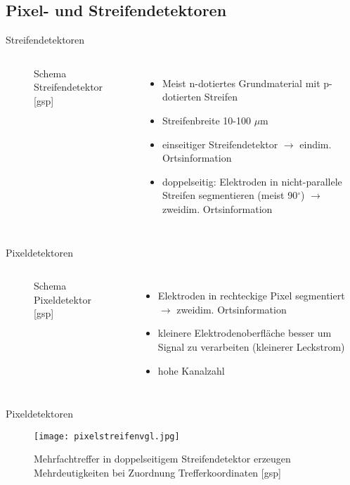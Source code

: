 \subsection[]{Pixel- und Streifendetektoren}


\begin{frame}{Streifendetektoren}
	\begin{columns}[T]
			\begin{figure}[htbp]
			  \centering
			   
			  \caption{Schema Streifendetektor [gsp]}
			\end{figure}
	    	\begin{itemize}
			  \item Meist n-dotiertes Grundmaterial mit p-dotierten Streifen
			  \item Streifenbreite 10-100 $\mu$m
			  \item einseitiger Streifendetektor $\rightarrow$ eindim. Ortsinformation
			  \item doppelseitig: Elektroden in nicht-parallele Streifen segmentieren (meist 90$^\circ$)
			  $\rightarrow$ zweidim. Ortsinformation
			\end{itemize}
    \end{columns}
\end{frame}

\begin{frame}{Pixeldetektoren}
	\begin{columns}[T]
			\begin{figure}[htbp]
			  \centering
			  
			  \caption{Schema Pixeldetektor [gsp]}
			\end{figure}	
	    	\begin{itemize}
			  \item Elektroden in rechteckige Pixel segmentiert $\rightarrow$ zweidim. Ortsinformation
			  \item kleinere Elektrodenoberfläche besser um Signal zu verarbeiten (kleinerer Leckstrom)
			  \item hohe Kanalzahl
			\end{itemize}
    \end{columns}
\end{frame}


\begin{frame}{Pixeldetektoren}
			\begin{figure}[htbp]
			  \centering
			  \texttt{[image: pixelstreifenvgl.jpg]}
			  \caption{Mehrfachtreffer in doppelseitigem Streifendetektor erzeugen Mehrdeutigkeiten bei Zuordnung
			Trefferkoordinaten [gsp]}
			\end{figure}	
\end{frame}


